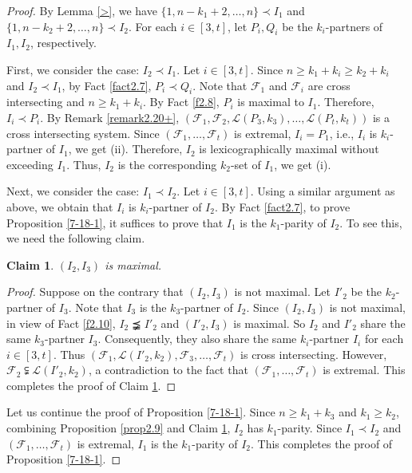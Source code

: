 \documentclass[10pt,a4paper]{amsart}
\newtheorem{claim}{Claim}
\begin{document}
\begin{proof}
By Lemma \ref{>}, we have $\{1, n-k_1+2, \dots, n\} \prec I_1$ and $\{1, n-k_2+2, \dots, n\} \prec I_2$.
For each $i\in [3, t]$,  let $P_i, Q_i$ be the $k_i$-partners of $I_1, I_2$, respectively.

First, we consider the case: $I_2\prec I_1$.
Let $i\in [3, t]$.
Since $n\geq k_1+k_i\geq k_2+k_i$ and $I_2\prec I_1$,
 by  Fact \ref{fact2.7}, $P_i\prec Q_i$. Note that $\mathcal{F}_1$ and $\mathcal{F}_i$ are cross intersecting and  $n\geq k_1+k_i$. By Fact \ref{f2.8}, $P_i$ is maximal to $I_1$. Therefore, $I_i\prec P_i$.
 By Remark \ref{remark2.20+}, $(\mathcal{F}_1, \mathcal{F}_2, \mathcal{L}(P_3, k_3), \dots, \mathcal{L}(P_t, k_t))$ is a cross intersecting system.
 Since
 $(\mathcal{F}_1, \dots, \mathcal{F}_t)$ is extremal, $I_i= P_1$, i.e., $I_i$ is $k_i$-partner of $I_1$, we get (ii). Therefore, $I_2$ is lexicographically maximal without exceeding $I_1$. Thus, $I_2$ is the corresponding $k_2$-set of $I_1$, we get (i).

Next, we consider the case: $I_1\prec I_2$.
Let $i\in [3, t]$.
Using a similar argument as above, we obtain that $I_i$ is $k_i$-partner of $I_2$.
By Fact \ref{fact2.7}, to prove Proposition \ref{7-18-1}, it suffices to prove that $I_1$ is the $k_1$-parity of $I_2$. To see this, we need the following claim.
\begin{claim}\label{7-18-2}
$(I_2, I_3)$ is maximal.
\end{claim}

\begin{proof}
Suppose on the contrary that  $(I_2, I_3)$ is not maximal.
Let $I'_2$ be the $k_2$-partner of $I_3$.
Note that $I_3$ is the $k_3$-partner of $I_2$.
Since $(I_2, I_3)$ is not maximal, in view of Fact \ref{f2.10},
$I_2\precneqq I'_2$ and $(I'_2, I_3)$ is maximal. So $I_2$ and $I'_2$ share the  same $k_3$-partner $I_3$. Consequently, they also share the  same $k_i$-partner $I_i$ for each $i\in [3, t]$.
Thus $(\mathcal{F}_1, \mathcal{L}(I'_2, k_2), \mathcal{F}_3, \dots, \mathcal{F}_t)$ is cross intersecting. However, $\mathcal{F}_2 \subsetneqq \mathcal{L}(I'_2, k_2)$, a contradiction to the fact that $(\mathcal{F}_1, \dots, \mathcal{F}_t)$ is extremal. This completes the proof of Claim \ref{7-18-2}.
\end{proof}

Let us continue the proof of Proposition \ref{7-18-1}.
Since $n\geq k_1+k_3$ and $k_1\geq k_2$, combining Proposition \ref{prop2.9}
and Claim \ref{7-18-2}, $I_2$ has $k_1$-parity. Since $I_1\prec I_2$ and $(\mathcal{F}_1, \dots, \mathcal{F}_t)$ is extremal, $I_1$ is the $k_1$-parity of $I_2$. This completes the proof of Proposition \ref{7-18-1}.
\end{proof}
\end{document}
